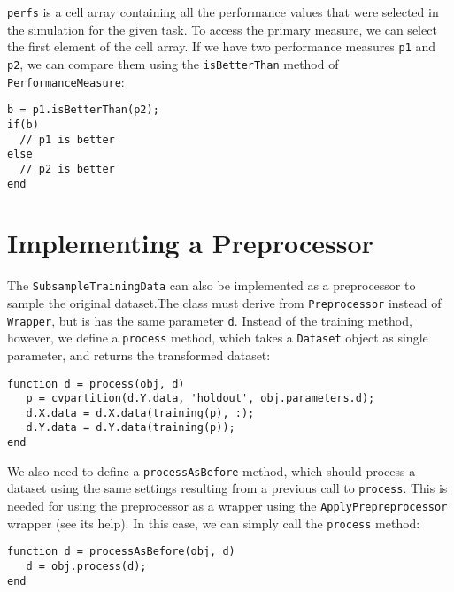 \noindent \verb|perfs| is a cell array containing all the performance values that were selected in the simulation for the given task. To access the primary measure, we can select the first element of the cell array. If we have two performance measures \verb|p1| and \verb|p2|, we can compare them using the \verb|isBetterThan| method of \verb|PerformanceMeasure|:

\begin{lstlisting}
b = p1.isBetterThan(p2);
if(b)
  // p1 is better
else
  // p2 is better
end
\end{lstlisting} 

\section{Implementing a Preprocessor}

The \verb|SubsampleTrainingData| can also be implemented as a preprocessor to sample the original dataset.The class must derive from \verb|Preprocessor| instead of \verb|Wrapper|, but is has the same parameter \verb|d|. Instead of the training method, however, we define a \verb|process| method, which takes a \verb|Dataset| object as single parameter, and returns the transformed dataset:

\begin{lstlisting}
function d = process(obj, d)
   p = cvpartition(d.Y.data, 'holdout', obj.parameters.d);
   d.X.data = d.X.data(training(p), :);
   d.Y.data = d.Y.data(training(p));
end
\end{lstlisting}

\noindent We also need to define a \verb|processAsBefore| method, which should process a dataset using the same settings resulting from a previous call to \verb|process|. This is needed for using the preprocessor as a wrapper using the \verb|ApplyPrepreprocessor| wrapper (see its help). In this case, we can simply call the \verb|process| method:

\begin{lstlisting}
function d = processAsBefore(obj, d)
   d = obj.process(d);
end
\end{lstlisting}